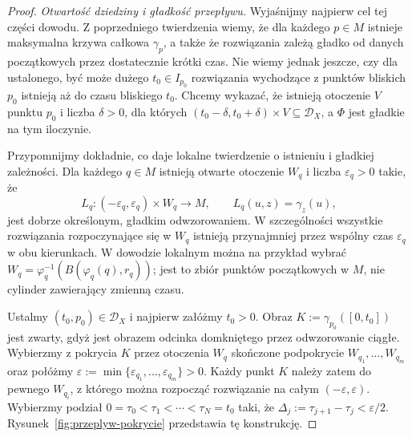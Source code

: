 \begin{proof}
\emph{Otwartość dziedziny i gładkość przepływu.}
Wyjaśnijmy najpierw cel tej części dowodu. Z poprzedniego
twierdzenia wiemy, że dla każdego $p\in M$ istnieje maksymalna
krzywa całkowa $\gamma_p$, a także że rozwiązania zależą gładko
od danych początkowych przez dostatecznie krótki czas.
Nie wiemy jednak jeszcze, czy dla ustalonego, być może dużego
$t_0\in I_{p_0}$ rozwiązania wychodzące z punktów bliskich $p_0$
istnieją aż do czasu bliskiego $t_0$. Chcemy wykazać, że istnieją
otoczenie $V$ punktu $p_0$ i liczba $\delta>0$, dla których
$ (t_0-\delta,t_0+\delta)\times V\subseteq\mathcal D_X$,
a $\Phi$ jest gładkie na tym iloczynie.

Przypomnijmy dokładnie, co daje lokalne twierdzenie o istnieniu
i gładkiej zależności. Dla każdego $q\in M$ istnieją otwarte
otoczenie $W_q$ i liczba $\varepsilon_q>0$ takie, że
\[
L_q\colon(-\varepsilon_q,\varepsilon_q)\times W_q\longrightarrow M,
\qquad L_q(u,z)=\gamma_z(u),
\]
jest dobrze określonym, gładkim odwzorowaniem. W szczególności
wszystkie rozwiązania rozpoczynające się w $W_q$ istnieją
przynajmniej przez wspólny czas $\varepsilon_q$ w obu kierunkach.
W dowodzie lokalnym można na przykład wybrać
$W_q=\varphi_q^{-1}(B(\varphi_q(q),r_q))$; jest to zbiór
punktów początkowych w $M$, nie cylinder zawierający zmienną czasu.

Ustalmy $(t_0,p_0)\in\mathcal D_X$ i najpierw załóżmy $t_0>0$.
Obraz $K:=\gamma_{p_0}([0,t_0])$ jest zwarty, gdyż jest obrazem
odcinka domkniętego przez odwzorowanie ciągłe. Wybierzmy z pokrycia
$K$ przez otoczenia $W_q$ skończone podpokrycie
$W_{q_1},\ldots,W_{q_m}$ oraz połóżmy
$\varepsilon:=\min\{\varepsilon_{q_1},\ldots,
\varepsilon_{q_m}\}>0$.
Każdy punkt $K$ należy zatem do pewnego $W_{q_i}$,
z którego można rozpocząć rozwiązanie na całym
$(-\varepsilon,\varepsilon)$. Wybierzmy podział
$0=\tau_0<\tau_1<\cdots<\tau_N=t_0$ taki, że
$\Delta_j:=\tau_{j+1}-\tau_j<\varepsilon/2$.
Rysunek~\ref{fig:przeplyw-pokrycie} przedstawia tę konstrukcję.


\end{proof}
